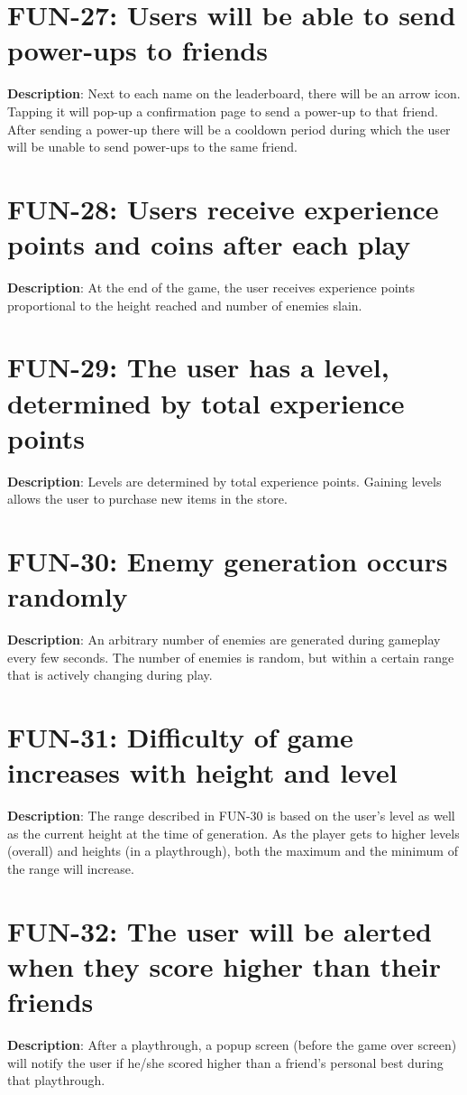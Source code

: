 \section{FUN-27: Users will be able to send power-ups to friends}
\textbf{Description}: Next to each name on the leaderboard, there
will be an arrow icon. Tapping it will pop-up a confirmation page
to send a power-up to that friend. After sending a power-up there
will be a cooldown period during which the user will be unable to
send power-ups to the same friend.
\section{FUN-28: Users receive experience points and coins after each play}
\textbf{Description}: At the end of the game, the user receives experience
points proportional to the height reached and number of enemies slain.
\section{FUN-29: The user has a level, determined by total experience points}
\textbf{Description}: Levels are determined by total experience points.
Gaining levels allows the user to purchase new items in the store.
\section{FUN-30: Enemy generation occurs randomly}
\textbf{Description}: An arbitrary number of enemies are generated
during gameplay every few seconds. The number of enemies is random,
but within a certain range that is actively changing during play. 
\section{FUN-31: Difficulty of game increases with height and level}
\textbf{Description}: The range described in FUN-30 is based on the
user\textquoteright{}s level as well as the current height at the
time of generation. As the player gets to higher levels (overall)
and heights (in a playthrough), both the maximum and the minimum of
the range will increase.
\section{FUN-32: The user will be alerted when they score higher than their
friends}
\textbf{Description}: After a playthrough, a popup screen (before
the game over screen) will notify the user if he/she scored higher
than a friend\textquoteright{}s personal best during that playthrough.
